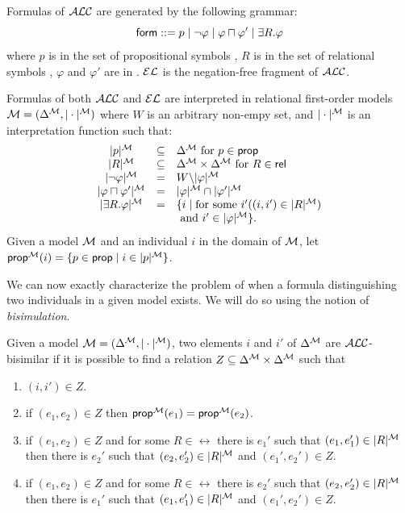 \begin{definition}
Formulas of $\mathcal{ALC}$ are generated by the following grammar:
$$
\textsf{form} ::= p \mid \neg \varphi \mid \varphi \sqcap \varphi' \mid \exists R. \varphi
$$
where $p$ is in the set of propositional symbols \prop, $R$ is in the set of relational symbols \rel, $\varphi$ and $\varphi'$ are in \form. $\mathcal{EL}$ is the
negation-free fragment of $\mathcal{ALC}$.

Formulas of both $\mathcal{ALC}$ and $\mathcal{EL}$ are interpreted in relational first-order models
$\mathcal{M} = (\Delta^{\mathcal{M}},|\cdot|^{\mathcal{M}})$ where $W$ is an arbitrary non-empy set, and $|\cdot|^{\mathcal{M}}$ is an interpretation
function such that:
$$
\begin{array}{ccl}
|p|^{\mathcal{M}} & \subseteq & \Delta^{\mathcal{M}}  \mbox{ for $p \in \textsf{prop}$}\\
|R|^{\mathcal{M}} & \subseteq & \Delta^{\mathcal{M}} \times \Delta^{\mathcal{M}}  \mbox{ for $R \in \textsf{rel}$}\\
|\neg \varphi|^{\mathcal{M}} & = & W \backslash |\varphi|^{\mathcal{M}}\\
|\varphi \sqcap \varphi'|^{\mathcal{M}} & = & |\varphi|^{\mathcal{M}} \cap |\varphi'|^{\mathcal{M}}\\
|\exists R.\varphi|^{\mathcal{M}} & = & \{i \mid \mbox{for some } i' ((i,i') \in |R|^{\mathcal{M}})\\
& & \mbox{ and } i' \in |\varphi|^{\mathcal{M}} \}.\\
\end{array}
$$
Given a model $\mathcal{M}$ and an individual $i$ in the domain of $\mathcal{M}$, let
$\textsf{prop}^{\mathcal{M}}(i) = \{p \in \textsf{prop} \mid i \in |p|^{\mathcal{M}}\}$.
\end{definition}

We can now exactly characterize the problem of when a formula distinguishing two
individuals in a given model exists. We will do so using the notion of \emph{bisimulation}.

\begin{definition}
Given a model $\mathcal{M} = (\Delta^{\mathcal{M}},|\cdot|^{\mathcal{M}})$, two elements $i$ and $i'$ of $\Delta^{\mathcal{M}}$ are $\mathcal{ALC}$-bisimilar if it is possible to find a relation $Z \subseteq \Delta^{\mathcal{M}} \times \Delta^{\mathcal{M}}$ such that
\begin{enumerate}
\item $(i,i') \in Z$.
\item if $(e_1, e_2) \in Z$ then $\textsf{prop}^{\mathcal{M}}(e_1) = \textsf{prop}^{\mathcal{M}}(e_2)$.
\item if $(e_1,e_2) \in Z$ and for some $R \in \rel$ there is $e_1'$ such that
$(e_1,e_1') \in |R|^{\mathcal{M}}$ then there is $e_2'$ such that $(e_2,e_2') \in |R|^{\mathcal{M}}$ and
$(e_1',e_2') \in Z$.
\item if $(e_1,e_2) \in Z$ and for some $R \in \rel$ there is $e_2'$ such that
$(e_2,e_2') \in |R|^{\mathcal{M}}$ then there is $e_1'$ such that $(e_1,e_1') \in |R|^{\mathcal{M}}$ and
$(e_1',e_2') \in Z$.
\end{enumerate}
\end{definition}

